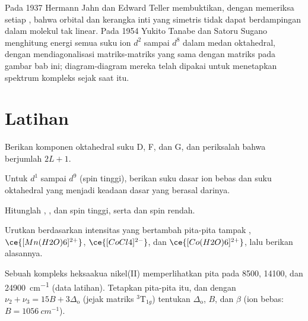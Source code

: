 \begin{history}
Pada 1937 Hermann Jahn dan Edward Teller membuktikan, dengan memeriksa setiap
, bahwa  orbital dan kerangka inti yang simetris tidak
dapat berdampingan dalam molekul tak linear. Pada 1954 Yukito Tanabe dan Satoru
Sugano menghitung energi semua suku ion $d^2$ sampai $d^8$ dalam medan
oktahedral, dengan mendiagonalisasi matriks-matriks yang sama dengan matriks
pada gambar bab ini; diagram-diagram mereka telah dipakai untuk menetapkan
spektrum kompleks sejak saat itu.
\end{history}

\section{Latihan}

\begin{exercise}[$\star$]\label{exo:b3:complex-spectra-magnetism:1}
Berikan komponen oktahedral suku D, F, dan G, dan periksalah bahwa
 berjumlah $2L + 1$.
\end{exercise}

\begin{exercise}[$\star$]\label{exo:b3:complex-spectra-magnetism:2}
Untuk $d^1$ sampai $d^9$ (spin tinggi), berikan suku dasar ion bebas dan suku oktahedral yang
menjadi keadaan dasar yang berasal darinya.
\end{exercise}

\begin{exercise}[$\star$]\label{exo:b3:complex-spectra-magnetism:3}
Hitunglah  , , dan  spin tinggi, serta
 dan  spin rendah.
\end{exercise}

\begin{exercise}[$\star$]\label{exo:b3:complex-spectra-magnetism:4}
Urutkan berdasarkan intensitas yang bertambah pita-pita tampak , $\ce{[Mn(H2O)6]^{2+}}$, $\ce{[CoCl4]^{2-}}$, dan
$\ce{[Co(H2O)6]^{2+}}$, lalu berikan alasannya.
\end{exercise}

\begin{exercise}[$\star\star$]\label{exo:b3:complex-spectra-magnetism:5}
Sebuah kompleks heksaakua nikel(II) memperlihatkan pita pada 8500, 14100, dan \qty{24900}{cm^{-1}} (data
latihan). Tetapkan pita-pita itu, dan dengan $\nu_2 + \nu_3 = 15B + 3\Delta_{\mathrm o}$ (jejak matriks $^3$T$_{1g}$)
tentukan $\Delta_{\mathrm o}$, $B$, dan $\beta$ (ion bebas: $B = \qty{1056}{cm^{-1}}$).
\end{exercise}

